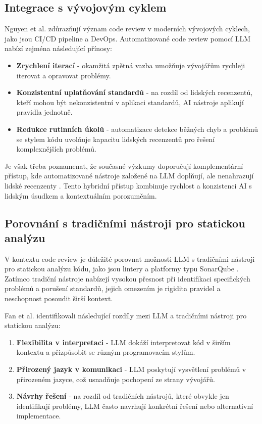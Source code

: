 \documentclass[12pt, a4paper]{article}
\begin{document}
\subsection{Integrace s vývojovým cyklem}

Nguyen et al. \cite{nguyen2023} zdůrazňují význam code review v moderních vývojových cyklech, jako jsou CI/CD pipeline a DevOps. Automatizované code review pomocí LLM nabízí zejména následující přínosy:

\begin{itemize}
    \item \textbf{Zrychlení iterací} - okamžitá zpětná vazba umožňuje vývojářům rychleji iterovat a opravovat problémy.
    \item \textbf{Konzistentní uplatňování standardů} - na rozdíl od lidských recenzentů, kteří mohou být nekonzistentní v aplikaci standardů, AI nástroje aplikují pravidla jednotně.
    \item \textbf{Redukce rutinních úkolů} - automatizace detekce běžných chyb a problémů se stylem kódu uvolňuje kapacitu lidských recenzentů pro řešení komplexnějších problémů.
\end{itemize}

Je však třeba poznamenat, že současné výzkumy doporučují komplementární přístup, kde automatizované nástroje založené na LLM doplňují, ale nenahrazují lidské recenzenty \cite{graphite2023}. Tento hybridní přístup kombinuje rychlost a konzistenci AI s lidským úsudkem a kontextuálním porozuměním.

\subsection{Porovnání s tradičními nástroji pro statickou analýzu}

V kontextu code review je důležité porovnat možnosti LLM s tradičními nástroji pro statickou analýzu kódu, jako jsou lintery a platformy typu SonarQube \cite{sonarqube2023}. Zatímco tradiční nástroje nabízejí vysokou přesnost při identifikaci specifických problémů a porušení standardů, jejich omezením je rigidita pravidel a neschopnost posoudit širší kontext.

Fan et al. \cite{fan2023} identifikovali následující rozdíly mezi LLM a tradičními nástroji pro statickou analýzu:

\begin{enumerate}
    \item \textbf{Flexibilita v interpretaci} - LLM dokáží interpretovat kód v širším kontextu a přizpůsobit se různým programovacím stylům.
    \item \textbf{Přirozený jazyk v komunikaci} - LLM poskytují vysvětlení problémů v přirozeném jazyce, což usnadňuje pochopení ze strany vývojářů.
    \item \textbf{Návrhy řešení} - na rozdíl od tradičních nástrojů, které obvykle jen identifikují problémy, LLM často navrhují konkrétní řešení nebo alternativní implementace.
\end{enumerate}
\end{document}
